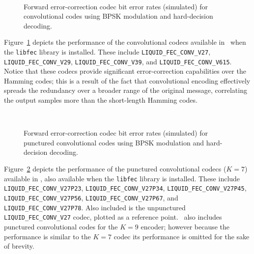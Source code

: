 \begin{figure}
\centering
\mbox{
} \quad
\mbox{
   \quad
}
\caption{Forward error-correction codec bit error rates (simulated)
         for convolutional codes
         using BPSK modulation and hard-decision decoding.}
\label{fig:fec:conv_ber}
\end{figure}
%
Figure~\ref{fig:fec:conv_ber} depicts the performance of the
convolutional codecs available in \liquid\ when the {\tt libfec} library
is installed.
These include
{\tt LIQUID\_FEC\_CONV\_V27},
{\tt LIQUID\_FEC\_CONV\_V29},
{\tt LIQUID\_FEC\_CONV\_V39}, and
{\tt LIQUID\_FEC\_CONV\_V615}.
Notice that these codecs provide significant error-correction
capabilities over the Hamming codes;
this is a result of the fact that convolutional encoding effectively
spreads the redundancy over a broader range of the original message,
correlating the output samples more than the short-length Hamming codes.


\begin{figure}
\centering
\mbox{
} \quad
\mbox{
   \quad
}
\caption{Forward error-correction codec bit error rates (simulated)
         for punctured convolutional codes
         using BPSK modulation and hard-decision decoding.}
\label{fig:fec:convpunc_ber}
\end{figure}
%
Figure~\ref{fig:fec:convpunc_ber} depicts the performance of the
punctured convolutional codecs ($K=7$) available in \liquid,
also available when the {\tt libfec} library is installed.
These include
{\tt LIQUID\_FEC\_CONV\_V27P23},
{\tt LIQUID\_FEC\_CONV\_V27P34},
{\tt LIQUID\_FEC\_CONV\_V27P45},
{\tt LIQUID\_FEC\_CONV\_V27P56},
{\tt LIQUID\_FEC\_CONV\_V27P67}, and
{\tt LIQUID\_FEC\_CONV\_V27P78}.
Also included is the unpunctured {\tt LIQUID\_FEC\_CONV\_V27} codec,
plotted as a reference point.
\liquid\ also includes punctured convolutional codes for the $K=9$
encoder;
however because the performance is similar to the $K=7$ codec
its performance is omitted for the sake of brevity.


